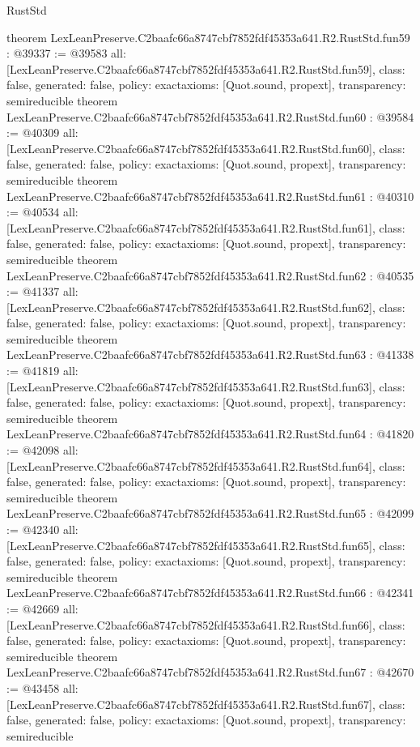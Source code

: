 \begin{lexlean}{RustStd}
\begin{coremodule}
{}
theorem LexLeanPreserve.C2baafc66a8747cbf7852fdf45353a641.R2.RustStd.fun59 : @39337 := @39583 {
  all: [LexLeanPreserve.C2baafc66a8747cbf7852fdf45353a641.R2.RustStd.fun59],
  class: false,
  generated: false,
  policy: exact{axioms: [Quot.sound, propext]},
  transparency: semireducible
}
theorem LexLeanPreserve.C2baafc66a8747cbf7852fdf45353a641.R2.RustStd.fun60 : @39584 := @40309 {
  all: [LexLeanPreserve.C2baafc66a8747cbf7852fdf45353a641.R2.RustStd.fun60],
  class: false,
  generated: false,
  policy: exact{axioms: [Quot.sound, propext]},
  transparency: semireducible
}
theorem LexLeanPreserve.C2baafc66a8747cbf7852fdf45353a641.R2.RustStd.fun61 : @40310 := @40534 {
  all: [LexLeanPreserve.C2baafc66a8747cbf7852fdf45353a641.R2.RustStd.fun61],
  class: false,
  generated: false,
  policy: exact{axioms: [Quot.sound, propext]},
  transparency: semireducible
}
theorem LexLeanPreserve.C2baafc66a8747cbf7852fdf45353a641.R2.RustStd.fun62 : @40535 := @41337 {
  all: [LexLeanPreserve.C2baafc66a8747cbf7852fdf45353a641.R2.RustStd.fun62],
  class: false,
  generated: false,
  policy: exact{axioms: [Quot.sound, propext]},
  transparency: semireducible
}
theorem LexLeanPreserve.C2baafc66a8747cbf7852fdf45353a641.R2.RustStd.fun63 : @41338 := @41819 {
  all: [LexLeanPreserve.C2baafc66a8747cbf7852fdf45353a641.R2.RustStd.fun63],
  class: false,
  generated: false,
  policy: exact{axioms: [Quot.sound, propext]},
  transparency: semireducible
}
theorem LexLeanPreserve.C2baafc66a8747cbf7852fdf45353a641.R2.RustStd.fun64 : @41820 := @42098 {
  all: [LexLeanPreserve.C2baafc66a8747cbf7852fdf45353a641.R2.RustStd.fun64],
  class: false,
  generated: false,
  policy: exact{axioms: [Quot.sound, propext]},
  transparency: semireducible
}
theorem LexLeanPreserve.C2baafc66a8747cbf7852fdf45353a641.R2.RustStd.fun65 : @42099 := @42340 {
  all: [LexLeanPreserve.C2baafc66a8747cbf7852fdf45353a641.R2.RustStd.fun65],
  class: false,
  generated: false,
  policy: exact{axioms: [Quot.sound, propext]},
  transparency: semireducible
}
theorem LexLeanPreserve.C2baafc66a8747cbf7852fdf45353a641.R2.RustStd.fun66 : @42341 := @42669 {
  all: [LexLeanPreserve.C2baafc66a8747cbf7852fdf45353a641.R2.RustStd.fun66],
  class: false,
  generated: false,
  policy: exact{axioms: [Quot.sound, propext]},
  transparency: semireducible
}
theorem LexLeanPreserve.C2baafc66a8747cbf7852fdf45353a641.R2.RustStd.fun67 : @42670 := @43458 {
  all: [LexLeanPreserve.C2baafc66a8747cbf7852fdf45353a641.R2.RustStd.fun67],
  class: false,
  generated: false,
  policy: exact{axioms: [Quot.sound, propext]},
  transparency: semireducible
}
\end{coremodule}
\end{lexlean}
